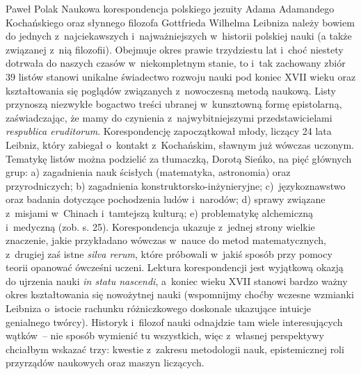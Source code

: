 \begin{recplenv}{Paweł Polak}
Naukowa korespondencja polskiego jezuity Adama Adamandego Kochańskiego oraz słynnego filozofa Gottfrieda Wilhelma
Lei\-bniza należy bowiem do jednych z~najciekawszych i~najważniejszych w~historii polskiej nauki (a także związanej z~nią
filozofii). Obejmuje okres prawie trzydziestu lat i~choć niestety dotrwała do naszych czasów w~niekompletnym stanie,
to i~tak zachowany zbiór 39 listów stanowi unikalne świadectwo rozwoju nauki pod koniec XVII wieku oraz kształtowania się
poglądów związanych z~nowoczesną metodą naukową. Listy przynoszą niezwykłe bogactwo treści ubranej w~kunsztowną formę
epistolarną, zaświadczając, że mamy do czynienia z~najwybitniejszymi przedstawicielami \textit{respublica eruditorum}.
Korespondencję zapoczątkował młody, liczący 24 lata Leibniz, który zabiegał o~kontakt z~Kochańskim, sławnym już wówczas
uczonym. Tematykę listów można podzielić za tłumaczką, Dorotą Sieńko, na pięć głównych grup: a) zagadnienia nauk
ścisłych (matematyka, astronomia) oraz przyrodniczych; b) zagadnienia konstruktorsko-inżynieryjne; c)~językoznawstwo
oraz badania dotyczące pochodzenia ludów i~narodów; d) sprawy związane z~misjami w~Chinach i~tamtejszą kulturą; e)
problematykę alchemiczną i~medyczną (zob. s. 25). Korespondencja ukazuje z~jednej strony wielkie znaczenie, jakie
przykładano wówczas w~nauce do metod matematycznych, z~drugiej zaś istne \textit{silva rerum}, które próbowali w~jakiś
sposób przy pomocy teorii opanować ówcześni uczeni. Lektura korespondencji jest wyjątkową okazją do ujrzenia nauki
\textit{in statu nascendi}, a~koniec wieku XVII stanowi bardzo ważny okres kształtowania się nowożytnej nauki
(wspomnijmy choćby wczesne wzmianki Leibniza o~istocie rachunku różniczkowego doskonale ukazujące intuicje genialnego
twórcy). Historyk i~filozof nauki odnajdzie tam wiele interesujących wątków~-- nie sposób wymienić tu wszystkich, więc z~własnej
perspektywy chciałbym wskazać trzy: kwestie z~zakresu metodologii nauk, epistemicznej roli przyrządów naukowych
oraz maszyn liczących.

\enlargethispage{1.5\baselineskip}


\end{recplenv}
